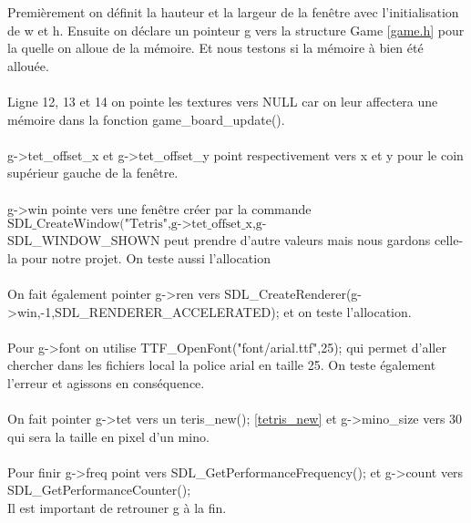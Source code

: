 \documentclass[a4paper,10p]{report}
\begin{document}
Premièrement on définit la hauteur et la largeur de la fenêtre avec l'initialisation de w et h. Ensuite on déclare un pointeur g vers la structure Game \ref{game.h} pour la quelle on alloue de la mémoire. Et nous testons si la mémoire à bien été allouée.
\\\\
Ligne \textcolor{gris}{12}, \textcolor{gris}{13} et \textcolor{gris}{14} on pointe les textures vers NULL car on leur affectera une mémoire dans la fonction game\_board\_update().
\\\\g->tet\_offset\_x et g->tet\_offset\_y point respectivement vers x et y pour le coin supérieur gauche de la fenêtre.
\\\\g->win pointe vers une fenêtre créer par la commande
\begin{equation*}
\text{SDL\_CreateWindow("Tetris",g->tet\_offset\_x,g->tet\_offset\_y,w,h,SDL\_WINDOW\_SHOWN);}
\end{equation*}
SDL\_WINDOW\_SHOWN peut prendre d'autre valeurs mais nous gardons celle-la pour notre projet. On teste aussi l'allocation
\\\\
On fait également pointer g->ren vers SDL\_CreateRenderer(g->win,-1,SDL\_RENDERER\_ACCELERATED); et on teste l'allocation.
\\\\Pour g->font on utilise TTF\_OpenFont("font/arial.ttf",25); qui permet d'aller chercher dans les fichiers local la police arial en taille 25. On teste également l'erreur et agissons en conséquence.
\\\\On fait pointer g->tet vers un teris\_new(); \ref{tetris_new} et g->mino\_size vers 30 qui sera la taille en pixel d'un mino.
\\\\Pour finir g->freq point vers SDL\_GetPerformanceFrequency(); et g->count vers SDL\_GetPerformanceCounter();
\\Il est important de retrouner g à la fin.
\end{document}
